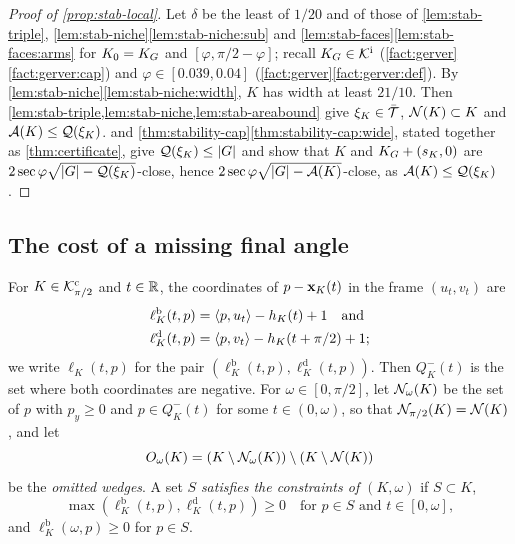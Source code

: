 \begin{proof}[Proof of \cref{prop:stab-local}]
Let $\delta$ be the least of $1/20$ and of those of \cref{lem:stab-triple},
\cref{lem:stab-niche}\ref{lem:stab-niche:sub} and
\cref{lem:stab-faces}\ref{lem:stab-faces:arms} for $K_0=K_G$ and
$[\varphi,\pi/2-\varphi]$; recall $K_G\in\mathcal{K}^{\mathrm{i}}$
(\cref{fact:gerver}\ref{fact:gerver:cap}) and $\varphi\in[0.039,0.04]$
(\cref{fact:gerver}\ref{fact:gerver:def}). By
\cref{lem:stab-niche}\ref{lem:stab-niche:width}, $K$ has width at least
$21/10$. Then \cref{lem:stab-triple,lem:stab-niche,lem:stab-areabound} give
$\xi_K\in\bar{\mathcal{T}}$, $\mathcal{N}(K)\subset K$ and $\mathcal{A}(K)\le\mathcal{Q}(\xi_K)$.
 and
\cref{thm:stability-cap}\ref{thm:stability-cap:wide}, stated together as
\cref{thm:certificate}, give $\mathcal{Q}(\xi_K)\le\lvert G\rvert$ and show that $K$ and
$K_G+(s_K,0)$ are $2\sec\varphi\sqrt{\lvert G\rvert-\mathcal{Q}(\xi_K)}$-close, hence
$2\sec\varphi\sqrt{\lvert G\rvert-\mathcal{A}(K)}$-close, as $\mathcal{A}(K)\le\mathcal{Q}(\xi_K)$.
\end{proof}

\subsection{The cost of a missing final angle}\label{sec:stab-angle}

For $K\in\mathcal{K}^{\mathrm{c}}_{\pi/2}$ and $t\in\mathbb{R}$, the coordinates of $p-\mathbf{x}_K(t)$ in the
frame $(u_t,v_t)$ are
\begin{align*}
  \ell^{\mathrm b}_K(t,p)&=\langle p,u_t\rangle-h_K(t)+1\quad\text{and}\\
  \ell^{\mathrm d}_K(t,p)&=\langle p,v_t\rangle-h_K(t+\pi/2)+1;
\end{align*}
we write $\ell_K(t,p)$ for the pair
$(\ell^{\mathrm b}_K(t,p),\ell^{\mathrm d}_K(t,p))$. Then $Q^-_K(t)$ is the set
where both coordinates are negative. For $\omega\in[0,\pi/2]$, let
$\mathcal{N}_\omega(K)$ be the set of $p$ with $p_y\ge0$ and $p\in Q^-_K(t)$ for some
$t\in(0,\omega)$, so that $\mathcal{N}_{\pi/2}(K)=\mathcal{N}(K)$, and let
\[
  O_\omega(K)=(K\setminus\mathcal{N}_\omega(K))\setminus(K\setminus\mathcal{N}(K))
\]
be the \emph{omitted wedges}. A set $S$ \emph{satisfies the constraints of
$(K,\omega)$} if $S\subset K$,
\[
  \max(\ell^{\mathrm b}_K(t,p),\ell^{\mathrm d}_K(t,p))\ge0\quad
  \text{for $p\in S$ and $t\in[0,\omega]$},
\]
and $\ell^{\mathrm b}_K(\omega,p)\ge0$ for $p\in S$.

